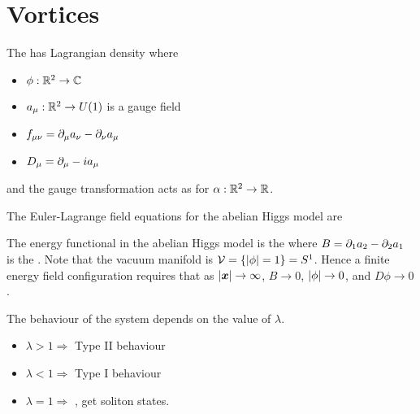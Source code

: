 \documentclass{article}
\begin{document}
\section{Vortices}

\begin{definition}
The  has Lagrangian density 
where 
\begin{itemize}
    \item $\phi:\mathbb{R}^2 \to \mathbb{C}$
    \item $a_\mu : \mathbb{R}^2 \to U(1)$ is a gauge field
    \item $f_{\mu\nu} = \partial_\mu a_\nu - \partial_\nu a_\mu$
    \item $D_\mu = \partial_\mu - ia_\mu$
\end{itemize}
and the gauge transformation acts as
for $\alpha : \mathbb{R}^2 \to \mathbb{R}$. 
\end{definition}

\begin{prop}
The Euler-Lagrange field equations for the abelian Higgs model are 
\end{prop}

\begin{prop}
The energy functional in the abelian Higgs model is the 
where $B = \partial_1 a_2 - \partial_2 a_1$ is the . Note that the vacuum manifold is $\mathcal{V} = \left\{ \left\lvert \phi \right\rvert = 1 \right\} = S^1$. Hence a finite energy field configuration requires that as $\left\lvert \bm{x} \right\rvert\to\infty$, $B\to 0$, $\left\lvert \phi \right\rvert\to 0$, and $D\phi \to 0$. 
\end{prop}

\begin{definition}
The behaviour of the system depends on the value of $\lambda$. 
\begin{itemize}
    \item $\lambda > 1 \Rightarrow$ Type II behaviour
    \item $\lambda < 1 \Rightarrow$ Type I behaviour
    \item $\lambda = 1 \Rightarrow$ , get soliton states. 
\end{itemize}
\end{definition}
\end{document}
